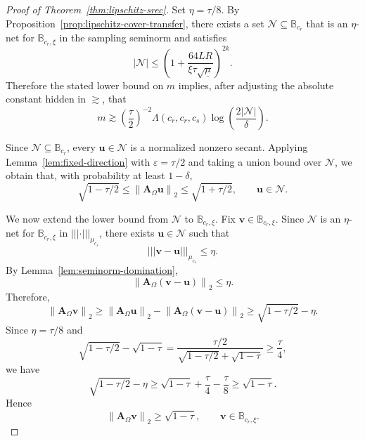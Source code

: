 \documentclass{article}
\theoremstyle{plain}
\theoremstyle{definition}
\theoremstyle{remark}
\newcommand*{\snorm}[2]{\left\vert\!\left\vert\!\left\vert #1 \right\vert\!\right\vert\!\right\vert_{#2}}
\begin{document}
\begin{proof}[Proof of Theorem~\ref{thm:lipschitz-srec}]
  Set
  $
    \eta=\tau/8.
  $
  By Proposition~\ref{prop:lipschitz-cover-transfer}, there exists a set
  $\mathcal N\subseteq\mathbb B_{c_r}$ that is an $\eta$-net for
  $\mathbb B_{c_r,\xi}$ in the sampling seminorm and satisfies
  \[
    \left|\mathcal N\right|
    \leq
    \left(
      1+
      \frac{64LR}
           {\xi\tau\sqrt{\underline{\mu}}}
    \right)^{2k}.
  \]
  Therefore the stated lower bound on $m$ implies, after adjusting the
  absolute constant hidden in $\gtrsim$, that
  \[
    m
    \gtrsim
    \left(\frac{\tau}{2}\right)^{-2}
    \Lambda\left(c_r,c_r,c_s\right)
    \log\left(
      \frac{2\left|\mathcal N\right|}{\delta}
    \right).
  \]

  Since $\mathcal N\subseteq\mathbb B_{c_r}$, every
  $\mathbf u\in\mathcal N$ is a normalized nonzero secant. Applying
  Lemma~\ref{lem:fixed-direction} with $\varepsilon=\tau/2$ and taking a
  union bound over $\mathcal N$, we obtain that, with probability at least
  $1-\delta$,
  \[
    \sqrt{1-\tau/2}
    \leq
    \left\|\mathbf A_\Omega\mathbf u\right\|_2
    \leq
    \sqrt{1+\tau/2},
    \qquad
    \mathbf u\in\mathcal N.
  \]

  We now extend the lower bound from $\mathcal N$ to
  $\mathbb B_{c_r,\xi}$. Fix $\mathbf v\in\mathbb B_{c_r,\xi}$. Since
  $\mathcal N$ is an $\eta$-net for $\mathbb B_{c_r,\xi}$ in
  $\snorm{\cdot}{\mu_{c_s}}$, there exists $\mathbf u\in\mathcal N$ such that
  \[
    \snorm{\mathbf v-\mathbf u}{\mu_{c_s}}\leq \eta.
  \]
  By Lemma~\ref{lem:seminorm-domination},
  \[
    \left\|\mathbf A_\Omega\left(\mathbf v-\mathbf u\right)\right\|_2
    \leq
    \eta.
  \]
  Therefore,
  \[
    \left\|\mathbf A_\Omega\mathbf v\right\|_2
    \geq
    \left\|\mathbf A_\Omega\mathbf u\right\|_2
    -
    \left\|\mathbf A_\Omega\left(\mathbf v-\mathbf u\right)\right\|_2
    \geq
    \sqrt{1-\tau/2}-\eta.
  \]
  Since $\eta=\tau/8$ and
  \[
    \sqrt{1-\tau/2}-\sqrt{1-\tau}
    =
    \frac{\tau/2}
         {\sqrt{1-\tau/2}+\sqrt{1-\tau}}
    \geq
    \frac{\tau}{4},
  \]
  we have
  \[
    \sqrt{1-\tau/2}-\eta
    \geq
    \sqrt{1-\tau}
    +
    \frac{\tau}{4}
    -
    \frac{\tau}{8}
    \geq
    \sqrt{1-\tau}.
  \]
  Hence
  \begin{equation}
  \left\|\mathbf A_\Omega\mathbf v\right\|_2
  \geq
  \sqrt{1-\tau},
  \qquad
  \mathbf v\in\mathbb B_{c_r,\xi}.
  \label{eq:srec-lower-bound-on-normalized-secants}
\end{equation}


\end{proof}
\end{document}
